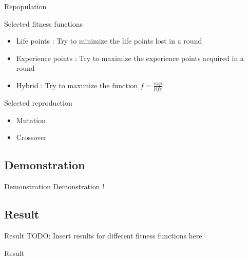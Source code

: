 \begin{frame}{Repopulation}
  \begin{block}{Selected fitness functions}
    \begin{itemize}
    \item Life points : Try to minimize the life points lost in a round
    \item Experience points : Try to maximize the experience points acquired in a round
    \item Hybrid : Try to maximize the function $f = \frac{exp}{life} $
    \end{itemize}
  \end{block}

  \begin{block}{Selected reproduction}
    \begin{itemize}
    \item Mutation
    \item Crossover
    \end{itemize}
  \end{block}
\end{frame}

\subsection{Demonstration}

\begin{frame}{Demonstration}
  Demonstration !
\end{frame}

\subsection{Result}

\begin{frame}{Result}
  TODO: Insert results for different fitness functions here
\end{frame}{Result}
